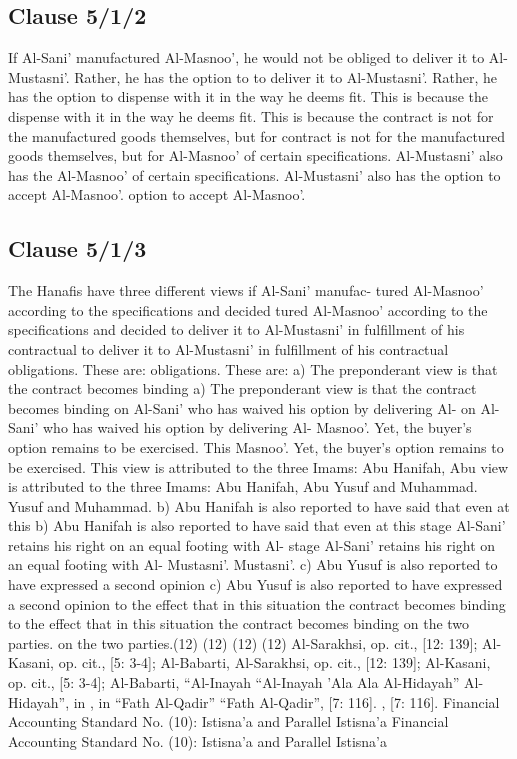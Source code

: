 \documentclass{article}%
\begin{document}
\subsection{Clause 5/1/2}%
\label{subsec:Clause5/1/2}%
If Al-Sani’ manufactured Al-Masnoo’, he would not be obliged  to deliver it to Al-Mustasni’. Rather, he has the option to  to deliver it to Al-Mustasni’. Rather, he has the option to  dispense with it in the way he deems fit. This is because the  dispense with it in the way he deems fit. This is because the  contract is not for the manufactured goods themselves, but for  contract is not for the manufactured goods themselves, but for  Al-Masnoo’ of certain specifications. Al-Mustasni’ also has the  Al-Masnoo’ of certain specifications. Al-Mustasni’ also has the  option to accept Al-Masnoo’. option to accept Al-Masnoo’.

%
\subsection{Clause 5/1/3}%
\label{subsec:Clause5/1/3}%
The Hanafis have three different views if Al-Sani’ manufac- tured Al-Masnoo’ according to the specifications and decided  tured Al-Masnoo’ according to the specifications and decided  to deliver it to Al-Mustasni’ in fulfillment of his contractual  to deliver it to Al-Mustasni’ in fulfillment of his contractual  obligations. These are: obligations. These are: a) The preponderant view is that the contract becomes binding  a) The preponderant view is that the contract becomes binding  on Al-Sani’ who has waived his option by delivering Al- on Al-Sani’ who has waived his option by delivering Al- Masnoo’. Yet, the buyer’s option remains to be exercised. This  Masnoo’. Yet, the buyer’s option remains to be exercised. This  view is attributed to the three Imams: Abu Hanifah, Abu  view is attributed to the three Imams: Abu Hanifah, Abu  Yusuf and Muhammad. Yusuf and Muhammad. b) Abu Hanifah is also reported to have said that even at this  b) Abu Hanifah is also reported to have said that even at this  stage Al-Sani’ retains his right on an equal footing with Al- stage Al-Sani’ retains his right on an equal footing with Al- Mustasni’. Mustasni’. c) Abu Yusuf is also reported to have expressed a second opinion  c) Abu Yusuf is also reported to have expressed a second opinion  to the effect that in this situation the contract becomes binding  to the effect that in this situation the contract becomes binding  on the two parties. on the two parties.(12) (12) (12) (12) Al-Sarakhsi, op. cit., [12: 139]; Al-Kasani, op. cit., [5: 3-4]; Al-Babarti,   Al-Sarakhsi, op. cit., [12: 139]; Al-Kasani, op. cit., [5: 3-4]; Al-Babarti, “Al-Inayah  “Al-Inayah ’Ala  Ala  Al-Hidayah” Al-Hidayah”, in  , in “Fath Al-Qadir” “Fath Al-Qadir”, [7: 116]. , [7: 116]. Financial Accounting Standard No. (10): Istisna’a and Parallel Istisna’a Financial Accounting Standard No. (10): Istisna’a and Parallel Istisna’a
\end{document}
